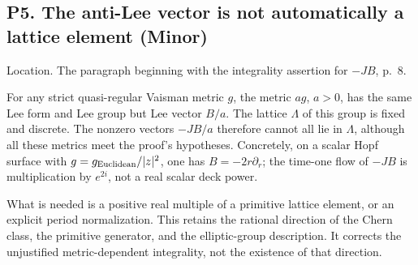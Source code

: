 \documentclass[10pt]{article}
\begin{document}
\subsection*{P5. The anti-Lee vector is not automatically a lattice element (Minor)}
Location. The paragraph beginning with the integrality assertion for \(-JB\), p. 8.\par
For any strict quasi-regular Vaisman metric \(g\), the metric \(ag\), \(a>0\), has the same Lee form and Lee group but Lee vector \(B/a\). The lattice \(\Lambda\) of this group is fixed and discrete. The nonzero vectors \(-JB/a\) therefore cannot all lie in \(\Lambda\), although all these metrics meet the proof’s hypotheses. Concretely, on a scalar Hopf surface with \(g=g_{\rm Euclidean}/|z|^2\), one has \(B=-2r\partial_r\); the time-one flow of \(-JB\) is multiplication by \(e^{2i}\), not a real scalar deck power.\par
What is needed is a positive real multiple of a primitive lattice element, or an explicit period normalization. This retains the rational direction of the Chern class, the primitive generator, and the elliptic-group description. It corrects the unjustified metric-dependent integrality, not the existence of that direction.\par
\end{document}
